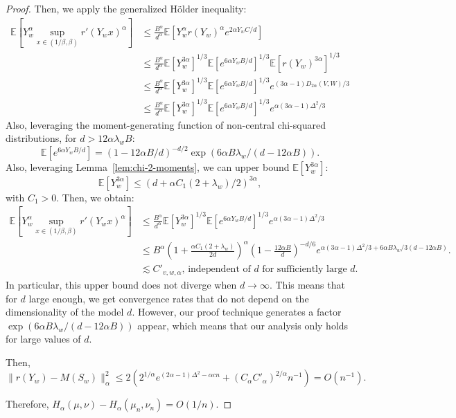 \documentclass{article}
\theoremstyle{plain}
\theoremstyle{definition}
\theoremstyle{remark}
\begin{document}
\begin{proof}
    Then, we apply the generalized Hölder inequality:
    \begin{align*}
        \mathbb{E}[Y_w^\alpha \sup_{x \in (1/\beta,\beta)} r'(Y_wx)^\alpha] &\leq \frac{B^\alpha}{d^\alpha}  \mathbb{E}[Y_w^\alpha  r(Y_w)^\alpha e^{2\alpha Y_wC/d}]\\
        &\leq \frac{B^\alpha}{d^\alpha}  \mathbb{E}[Y_w^{3\alpha}]^{1/3} \mathbb{E}[e^{6\alpha Y_w B/d}]^{1/3} \mathbb{E}[r(Y_w)^{3\alpha}]^{1/3}\\
        &\leq \frac{B^\alpha}{d^\alpha}\mathbb{E}[Y_w^{3\alpha}]^{1/3} \mathbb{E}[e^{6\alpha Y_w B/d}]^{1/3} e^{(3\alpha-1)D_{2\alpha}(V,W)/3}\\
        &\leq \frac{B^\alpha}{d^\alpha} \mathbb{E}[Y_w^{3\alpha}]^{1/3} \mathbb{E}[e^{6\alpha Y_w B/d}]^{1/3}  e^{\alpha(3\alpha-1)\Delta^2/3}
    \end{align*}
    Also, leveraging the moment-generating function of non-central chi-squared distributions, for $d > 12 \alpha \lambda_w  B$:
    \[\mathbb{E}[e^{6\alpha Y_w B/d}] = (1-12\alpha B/d)^{-d/2} \exp(6\alpha B\lambda_w/(d-12\alpha B)).\]
    Also, leveraging Lemma~\ref{lem:chi-2-moments}, we can upper bound $\mathbb{E}[Y_w^{3\alpha}]$:
    \[\mathbb{E}[Y_w^{3\alpha}] \leq (d+ \alpha C_1 (2 + \lambda_w)/2)^{3\alpha},\]
    with $C_1 > 0$.
    Then, we obtain:
    \begin{align*}
        \mathbb{E}[Y_w^\alpha \sup_{x \in (1/\beta,\beta)} r'(Y_wx)^\alpha] &\leq \frac{B^\alpha}{d^\alpha} \mathbb{E}[Y_w^{3\alpha}]^{1/3} \mathbb{E}[e^{6\alpha Y_w B/d}]^{1/3}  e^{\alpha(3\alpha-1)\Delta^2/3}\\
        &\leq B^\alpha \left(1+ \frac{\alpha C_1 (2 + \lambda_w)}{2d}\right)^{\alpha}  \left(1- \frac{12\alpha B}{d}\right)^{-d/6} e^{\alpha(3\alpha-1)\Delta^2/3 + 6\alpha B\lambda_w/3(d-12\alpha B)}.\\
        &\lesssim C'_{v,w,\alpha} \text{, independent of $d$ for sufficiently large $d$}.
    \end{align*}
    In particular, this upper bound does not diverge when $d \to \infty$. This means that for $d$ large enough, we get convergence rates that do not depend on the dimensionality of the model $d$. However, our proof technique generates a factor $\exp(6\alpha B\lambda_w/(d-12\alpha B))$ appear, which means that our analysis only holds for large values of $d$.

    Then, 
    \[\|r(Y_w)-M(S_w)\|_\alpha^2 \leq 2(2^{1/\alpha}e^{(2\alpha - 1) \Delta^2-\alpha cn}+ (C_\alpha C'_\alpha )^{2/\alpha} n^{-1}) = O(n^{-1}).\]

    Therefore, $H_\alpha(\mu, \nu) - H_\alpha(\mu_n, \nu_n) = O(1/n)$.
\end{proof}
\end{document}
